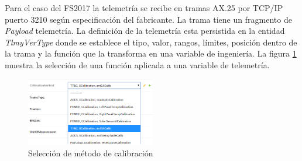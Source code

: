 \documentclass[twoside,twocolumn]{article}
\begin{document}
Para el caso del FS2017 la telemetría se recibe en tramas AX.25 por TCP/IP puerto 3210 según especificación del fabricante. La trama tiene un fragmento de \textit{Payload} telemetría. La definición de la telemetría esta persistida en la entidad \textit{TlmyVerType} donde se establece el tipo, valor, rangos, límites, posición dentro de la trama y la función que la transforma en una variable de ingeniería. La figura \ref{fig:MetodoCalibracion} muestra la selección de una función aplicada a una variable de telemetría.

\begin{figure}[]
  \caption{Selección de método de calibración}
  \label{fig:MetodoCalibracion}
  \centering
  \includegraphics[width=0.5\textwidth]{Imagenes/TTCCalibracionDiscreta.png}
\end{figure}
\end{document}

